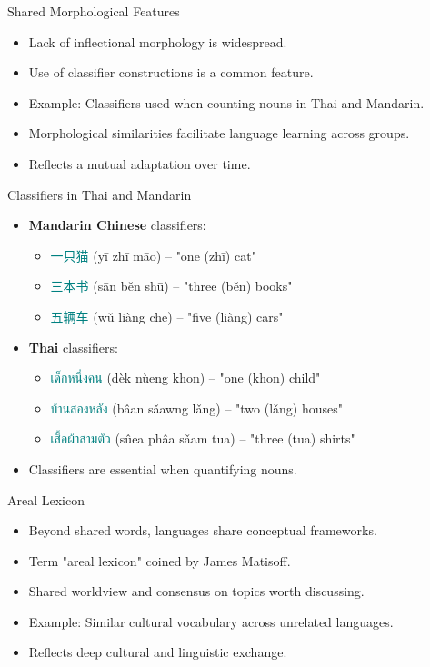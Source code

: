 \documentclass{beamer}
\newcommand{\mtplain}[1]{\textcolor{teal}{#1}}
\newcommand{\tha}[1]{\mtplain{\textthai{#1}}}
\newcommand{\zh}[1]{\mtplain{#1}}
\begin{document}
\begin{frame}{Shared Morphological Features}
    \begin{itemize}
        \item Lack of inflectional morphology is widespread.
        \item Use of classifier constructions is a common feature.
        \item Example: Classifiers used when counting nouns in Thai and Mandarin.
        \item Morphological similarities facilitate language learning across groups.
        \item Reflects a mutual adaptation over time.
    \end{itemize}
\end{frame}
\begin{frame}{Classifiers in Thai and Mandarin}
    \begin{itemize}
        \item \textbf{Mandarin Chinese} classifiers:
            \begin{itemize}
                \item \zh{一只猫} (yī zhī māo) – "one (zhī) cat"
                \item \zh{三本书} (sān běn shū) – "three (běn) books"
                \item \zh{五辆车} (wǔ liàng chē) – "five (liàng) cars"
            \end{itemize}
        \item \textbf{Thai} classifiers:
            \begin{itemize}
                \item \tha{เด็กหนึ่งคน} (dèk nùeng khon) – "one (khon) child"
                \item \tha{บ้านสองหลัง} (bâan sǎawng lǎng) – "two (lǎng) houses"
                \item \tha{เสื้อผ้าสามตัว} (sûea phâa sǎam tua) – "three (tua) shirts"
            \end{itemize}
        \item Classifiers are essential when quantifying nouns.
    \end{itemize}
  \end{frame}
  
\begin{frame}{Areal Lexicon}
    \begin{itemize}
        \item Beyond shared words, languages share conceptual frameworks.
        \item Term "areal lexicon" coined by James Matisoff.
        \item Shared worldview and consensus on topics worth discussing.
        \item Example: Similar cultural vocabulary across unrelated languages.
        \item Reflects deep cultural and linguistic exchange.
    \end{itemize}
\end{frame}
\end{document}

